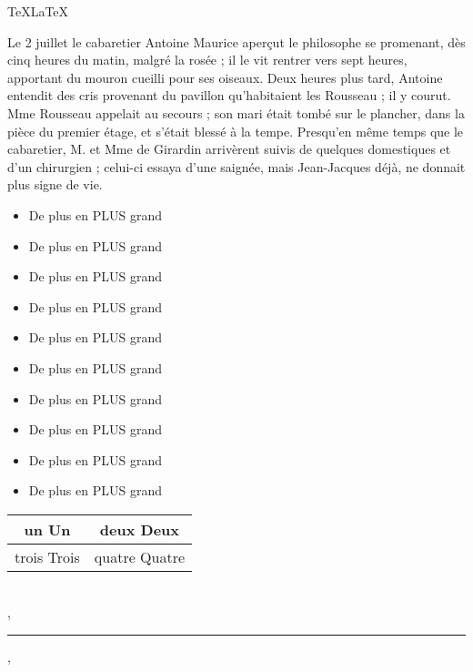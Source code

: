 \documentclass[10pt]{article}
\begin{document}
\centerline{\TeX \LaTeX}
\vspace{1cm} 
%
Le 2 juillet le cabaretier Antoine Maurice aperçut le philosophe se promenant, dès cinq heures du
matin, malgré la rosée ; il le vit rentrer vers sept heures, apportant du mouron cueilli pour ses
oiseaux.  Deux heures plus tard, Antoine entendit des cris provenant du pavillon qu'habitaient les
Rousseau ; il y courut. Mme Rousseau appelait au secours ; son mari était tombé sur le plancher,
dans la pièce du premier étage, et s'était blessé à la tempe. Presqu'en même temps que le
cabaretier, M. et Mme de Girardin arrivèrent suivis de quelques domestiques et d'un chirurgien ;
celui-ci essaya d'une saignée, mais Jean-Jacques déjà, ne donnait plus signe de vie. \\[1cm]
%
\centerline{}
%
\vspace{1cm}
%
\newcommand{\aText}{De plus en PLUS grand}
%
\begin{itemize}
\item \tiny \aText
\item \scriptsize \aText
\item \footnotesize \aText
\item \small \aText
\item \normalsize \aText
\item \large \aText
\item \Large \aText
\item \LARGE \aText
\item \huge \aText
\item \Huge \aText
\end{itemize}
%
\vspace{1cm}
%
\begin{center}
\begin{tabular}{|c|c|}
  \hline
  un Un & deux Deux \\
  \hline
  trois Trois & quatre Quatre \\
  \hline
\end{tabular} \\
%
\vspace{1cm}
%
,\rule{1cm}{1cm},
%
\end{center}
%
\end{document}
